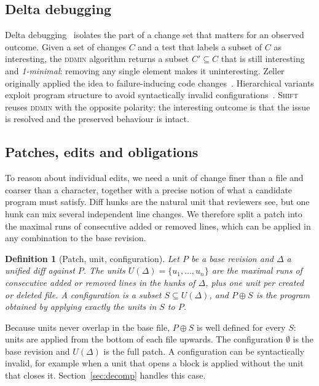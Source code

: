 \documentclass[a4paper,fleqn]{cas-sc}
\newcommand{\tool}{\textsc{Shift}}
\newtheorem{definition}{Definition}
\begin{document}
\subsection{Delta debugging}\label{sec:bg-dd}
Delta debugging~\citep{zeller1999yesterday,zeller2002ddmin} isolates the part of a change set that matters for an observed outcome. Given a set of changes $C$ and a test that labels a subset of $C$ as interesting, the \textsc{ddmin} algorithm returns a subset $C' \subseteq C$ that is still interesting and \emph{1-minimal}: removing any single element makes it uninteresting. Zeller originally applied the idea to failure-inducing code changes~\citep{zeller1999yesterday}. Hierarchical variants exploit program structure to avoid syntactically invalid configurations~\citep{misherghi2006hdd}. \tool{} reuses \textsc{ddmin} with the opposite polarity: the interesting outcome is that the issue is resolved and the preserved behaviour is intact.

\subsection{Patches, edits and obligations}\label{sec:bg-defs}
To reason about individual edits, we need a unit of change finer than a file and coarser than a character, together with a precise notion of what a candidate program must satisfy. Diff hunks are the natural unit that reviewers see, but one hunk can mix several independent line changes. We therefore split a patch into the maximal runs of consecutive added or removed lines, which can be applied in any combination to the base revision.

\begin{definition}[Patch, unit, configuration]\label{def:units}
Let $P$ be a base revision and $\Delta$ a unified diff against $P$. The \emph{units} $U(\Delta)=\{u_1,\dots,u_n\}$ are the maximal runs of consecutive added or removed lines in the hunks of $\Delta$, plus one unit per created or deleted file. A \emph{configuration} is a subset $S\subseteq U(\Delta)$, and $P\oplus S$ is the program obtained by applying exactly the units in $S$ to $P$.
\end{definition}

Because units never overlap in the base file, $P\oplus S$ is well defined for every $S$: units are applied from the bottom of each file upwards. The configuration $\emptyset$ is the base revision and $U(\Delta)$ is the full patch. A configuration can be syntactically invalid, for example when a unit that opens a block is applied without the unit that closes it. Section~\ref{sec:decomp} handles this case.
\end{document}
